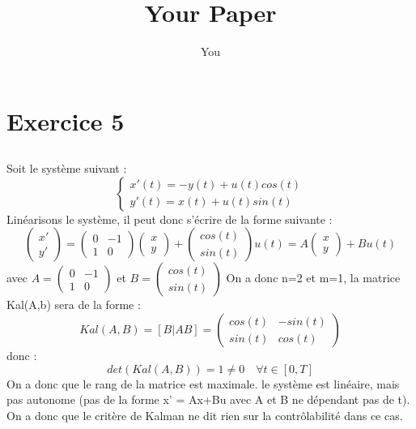 \documentclass{article}
\title{Your Paper}
\author{You}
\begin{document}
\section{Exercice 5}
\subsection{}
Soit le système suivant :
$$
\left\{
    \begin{array}{ll}
        x'(t)=-y(t) + u(t)cos(t) \\
        y'(t)=x(t)+u(t)sin(t)
    \end{array}
\right.
$$
Linéarisons le système, il peut donc s'écrire de la forme suivante :
\[
\begin{pmatrix}
x'\\
y'
\end{pmatrix} =\begin{pmatrix}
0 & -1 \\
1 & 0 
\end{pmatrix}\begin{pmatrix}
x\\
y 
\end{pmatrix} + \begin{pmatrix}
cos(t)\\
sin(t)
\end{pmatrix} u(t) = A \begin{pmatrix}
x \\
y 
\end{pmatrix} + B u(t)
\]
avec $A =\begin{pmatrix}
0 & -1 \\
1 & 0 
\end{pmatrix}$ et $B = \begin{pmatrix}
cos(t) \\
sin(t)
\end{pmatrix}$
\newline{}
On a donc n=2 et m=1, la matrice Kal(A,b) sera de la forme : 
\[
Kal(A,B)=[B|AB]=\begin{pmatrix}
cos(t) & -sin(t)  \\
sin(t) & cos(t)
\end{pmatrix}
\]
donc :
\[
det(Kal(A,B))= 1 \neq 0 \quad \forall t \in [0,T]
\]
On a donc que le rang de la matrice est maximale. le système est linéaire, mais pas autonome (pas de la forme x’ = Ax+Bu avec A et B ne dépendant pas de t). On a donc que le  critère de Kalman ne dit rien sur la contrôlabilité dans ce cas.
\end{document}
